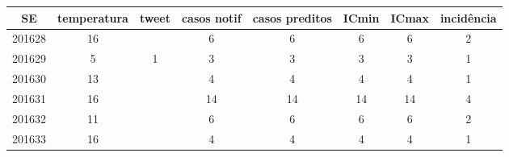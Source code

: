 \begin{tabular}{c|ccccccc}
  \hline
SE & temperatura & tweet & casos notif & casos preditos & ICmin & ICmax & incidência \\ 
  \hline
201628 & 16 &  & 6 & 6 & 6 & 6 & 2 \\ 
  201629 & 5 & 1 & 3 & 3 & 3 & 3 & 1 \\ 
  201630 & 13 &  & 4 & 4 & 4 & 4 & 1 \\ 
  201631 & 16 &  & 14 & 14 & 14 & 14 & 4 \\ 
  201632 & 11 &  & 6 & 6 & 6 & 6 & 2 \\ 
  201633 & 16 &  & 4 & 4 & 4 & 4 & 1 \\ 
   \hline
\end{tabular}
